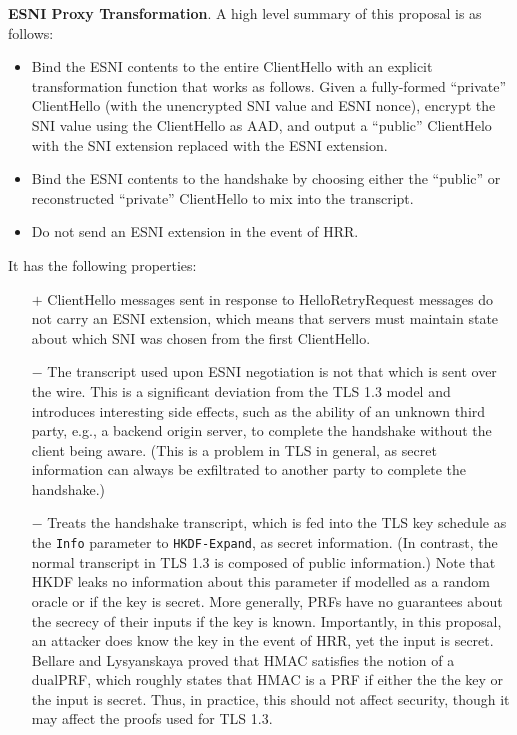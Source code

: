 \documentclass{article}
\theoremstyle{definition}
\begin{document}
\textbf{ESNI Proxy Transformation}. A high level summary of this proposal is as follows:
%
\begin{itemize}
  \item Bind the ESNI contents to the entire ClientHello with an explicit transformation function
  that works as follows. Given a fully-formed ``private'' ClientHello (with the unencrypted SNI 
  value and ESNI nonce), encrypt the SNI value using the ClientHello as AAD, and output a ``public'' 
  ClientHelo with the SNI extension replaced with the ESNI extension. 
  \item Bind the ESNI contents to the handshake by choosing either the ``public'' or reconstructed
  ``private'' ClientHello to mix into the transcript. 
  \item Do not send an ESNI extension in the event of HRR.
\end{itemize}
%
It has the following properties:
%
\begin{itemize}
  \item[$+$] ClientHello messages sent in response to HelloRetryRequest messages do not carry an ESNI
  extension, which means that servers must maintain state about which SNI was chosen from the first ClientHello.
  \item[$-$] The transcript used upon ESNI negotiation is not that which is sent over the wire. This is
  a significant deviation from the TLS 1.3 model and introduces interesting side effects, such as the
  ability of an unknown third party, e.g., a backend origin server, to complete the handshake without
  the client being aware. (This is a problem in TLS in general, as secret information can always be
  exfiltrated to another party to complete the handshake.)
  \item[$-$] Treats the handshake transcript, which is fed into the TLS key schedule as the {\tt Info}
  parameter to {\tt HKDF-Expand}, as secret information. (In contrast, the normal transcript in TLS 1.3
  is composed of public information.) Note that HKDF leaks no information about this parameter
  if modelled as a random oracle or if the key is secret. More generally, PRFs have no guarantees about
  the secrecy of their inputs if the key is known. Importantly, in this proposal, an attacker
  does know the key in the event of HRR, yet the input is secret. Bellare and Lysyanskaya \cite{bellare2015symmetric}
  proved that HMAC satisfies the notion of a dualPRF, which roughly states that HMAC is a PRF if 
  either the the key or the input is secret. Thus, in practice, this should not affect security, though
  it may affect the proofs used for TLS 1.3.
\end{itemize}
%
\end{document}
